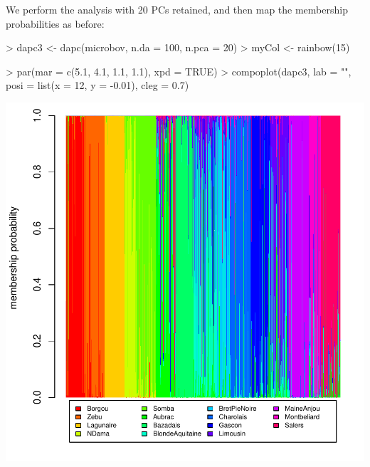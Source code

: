 \documentclass{article}
\begin{document}
We perform the analysis with 20 PCs retained, and then map the membership probabilities as before:
\begin{Schunk}
\begin{Sinput}
> dapc3 <- dapc(microbov, n.da = 100, n.pca = 20)
> myCol <- rainbow(15)
\end{Sinput}
\end{Schunk}
\begin{Schunk}
\begin{Sinput}
> par(mar = c(5.1, 4.1, 1.1, 1.1), xpd = TRUE)
> compoplot(dapc3, lab = "", posi = list(x = 12, y = -0.01), cleg = 0.7)
\end{Sinput}
\end{Schunk}
\includegraphics{figs/dapc-036}
\end{document}
